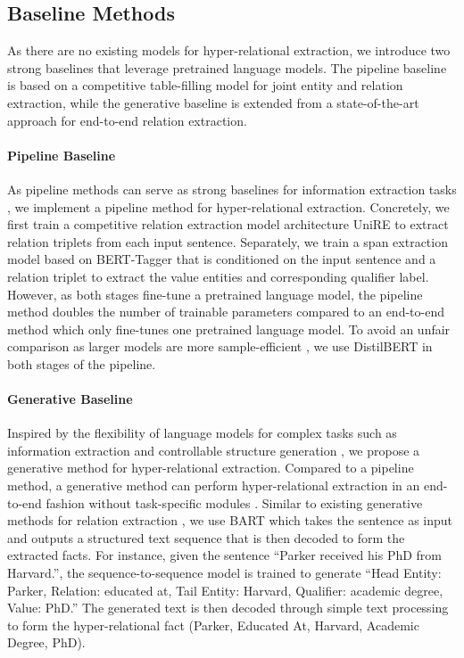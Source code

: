 \documentclass[11pt]{article}
\begin{document}
\subsection{Baseline Methods}
\label{sec:baseline}
As there are no existing models for hyper-relational extraction, we introduce two strong baselines that leverage pretrained language models. 
The pipeline baseline is based on a competitive table-filling model for joint entity and relation extraction, while the generative baseline is extended from a state-of-the-art approach for end-to-end relation extraction.

\paragraph{Pipeline Baseline}
As pipeline methods can serve as strong baselines for information extraction tasks \citep{zhong-chen-2021-frustratingly}, we implement a pipeline method for hyper-relational extraction.
Concretely, we first train a competitive relation extraction model architecture UniRE \citep{wang-etal-2021-unire} to extract relation triplets from each input sentence.
Separately, we train a span extraction model based on BERT-Tagger \citep{devlin-etal-2019-bert} that is conditioned on the input sentence and a relation triplet to extract the value entities and corresponding qualifier label.
However, as both stages fine-tune a pretrained language model, the pipeline method doubles the number of trainable parameters compared to an end-to-end method which only fine-tunes one pretrained language model.
To avoid an unfair comparison as larger models are more sample-efficient \citep{DBLP:journals/corr/abs-2001-08361}, we use DistilBERT \citep{DBLP:journals/corr/abs-1910-01108} in both stages of the pipeline.

\paragraph{Generative Baseline}
Inspired by the flexibility of language models for complex tasks such as information extraction and controllable structure generation \citep{shen-etal-2022-mred}, we propose a generative method for hyper-relational extraction. 
Compared to a pipeline method, a generative method can perform hyper-relational extraction in an end-to-end fashion without task-specific modules \citep{paolini2021structured}.
Similar to existing generative methods for relation extraction \citep{huguet-cabot-navigli-2021-rebel-relation, chia-etal-2022-relationprompt}, we use BART \citep{lewis-etal-2020-bart} which takes the sentence as input and outputs a structured text sequence that is then decoded to form the extracted facts.
For instance, given the sentence ``Parker received his PhD from Harvard.'', the sequence-to-sequence model is trained to generate ``Head Entity: Parker, Relation: educated at, Tail Entity: Harvard, Qualifier: academic degree, Value: PhD.''
The generated text is then decoded through simple text processing to form the hyper-relational fact (Parker, Educated At, Harvard, Academic Degree, PhD). 
\end{document}
